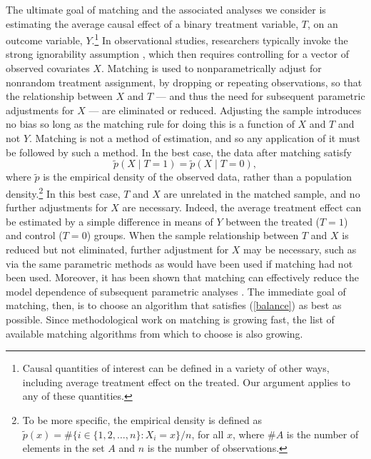 \documentclass[11pt,titlepage]{article}
\begin{document}
The ultimate goal of matching and the associated analyses we consider
is estimating the average causal effect of a binary treatment
variable, $T$, on an outcome variable, $Y$.\footnote{Causal quantities
  of interest can be defined in a variety of other ways, including
  average treatment effect on the treated.  Our argument applies to
  any of these quantities.}  In observational studies, researchers
typically invoke the strong ignorability assumption \citep{RosRub83},
which then requires controlling for a vector of observed covariates
$X$.  Matching is used to nonparametrically adjust for nonrandom
treatment assignment, by dropping or repeating observations, so that
the relationship between $X$ and $T$ --- and thus the need for
subsequent parametric adjustments for $X$ --- are eliminated or
reduced.  Adjusting the sample introduces no bias so long as the
matching rule for doing this is a function of $X$ and $T$ and not $Y$.
Matching is not a method of estimation, and so any application of it
must be followed by such a method.  In the best case, the data after
matching satisfy
\begin{equation}
  \label{balance}
  \tilde p(X\mid T=1) = \tilde p(X\mid T=0),
\end{equation}
where $\tilde p$ is the empirical density of the observed data, rather
than a population density.\footnote{To be more specific, the empirical
  density is defined as $\tilde p(x) = \# \{ i\in \{1, 2, \dots, n \}:
  X_i = x \} / n$, for all $x$, where $\#A$ is the number of elements
  in the set $A$ and $n$ is the number of observations. } In this best
case, $T$ and $X$ are unrelated in the matched sample, and no further
adjustments for $X$ are necessary. Indeed, the average treatment
effect can be estimated by a simple difference in means of $Y$ between
the treated ($T=1$) and control ($T=0$) groups.  When the sample
relationship between $T$ and $X$ is reduced but not eliminated,
further adjustment for $X$ may be necessary, such as via the same
parametric methods as would have been used if matching had not been
used. Moreover, it has been shown that matching can effectively reduce
the model dependence of subsequent parametric analyses
\citep{HoImaKin06}.  The immediate goal of matching, then, is to
choose an algorithm that satisfies (\ref{balance}) as best as
possible.  Since methodological work on matching is growing fast, the
list of available matching algorithms from which to choose is also
growing.
\end{document}
